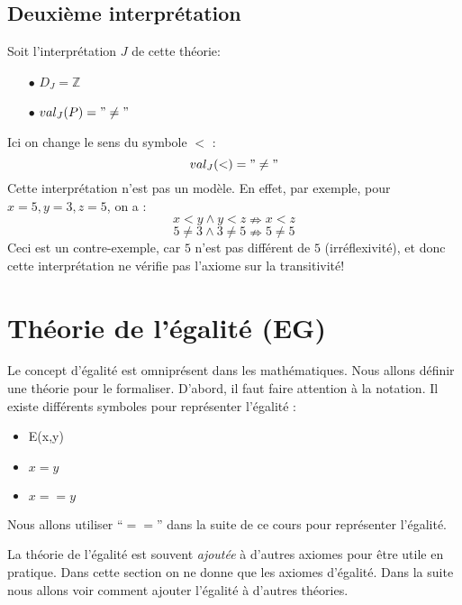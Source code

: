 {\subsection*{Deuxième interprétation}
Soit l'interprétation $J$ de cette théorie:
\begin{itemize}
\item[$\bullet$] $D_J = \mathbb{Z} $
\item[$\bullet$] $val_J (P) = "\ne"$
\end{itemize}
Ici on change le sens du symbole $<$ :
$$val_J(<) = "\ne"$$
Cette interprétation n'est pas un modèle. En effet, par exemple, pour $x=5, y=3, z=5$, on a :
$$x<y \wedge y<z \nRightarrow x<z$$
$$5 \neq 3 \wedge 3 \neq 5 \nRightarrow 5 \neq 5$$
Ceci est un contre-exemple, car $5$ n'est pas différent de $5$ (irréflexivité),
et donc cette interprétation ne vérifie pas l'axiome sur la transitivité!



\section{Théorie de l'égalité (EG)}

Le concept d'égalité est omniprésent dans les mathématiques.
Nous allons définir une théorie pour le formaliser.
D'abord, il faut faire attention à la notation.
Il existe différents symboles pour représenter l'égalité : 
\begin{itemize}
	\item E(x,y)
	\item $x = y$
	\item $x == y $
\end{itemize}
Nous allons utiliser ``$==$'' dans la suite de ce cours pour représenter l'égalité.

La théorie de l'égalité est souvent {\em ajoutée} à d'autres axiomes pour être utile en pratique.
Dans cette section on ne donne que les axiomes d'égalité.  Dans la suite nous allons voir comment
ajouter l'égalité à d'autres théories.

}
